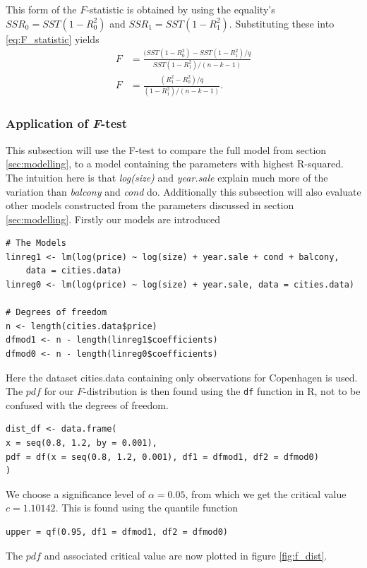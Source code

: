 This form of the $F$-statistic is obtained by using the equality's $SSR_0 = SST(1 - R^2_0)$ and $SSR_1 = SST(1-R^2_1)$. Substituting these into \eqref{eq:F_statistic} yields
\begin{align}\label{eq:F_test_R}
    F &= \frac{(SST(1 - R^2_0) - SST(1-R^2_1)/q}{SST(1-R^2_1)/(n-k-1)} \nonumber \\
    F &= \frac{(R^2_1 - R^2_0)/q}{(1 - R^2_1)/(n-k-1)}.
\end{align}


\subsubsection{Application of \textit{F}-test}\label{sec:app_F_test}
This subsection will use the F-test to compare the full model from section \ref{sec:modelling}, to a model containing the parameters with highest R-squared. 
The intuition here is that \textit{log(size)} and \textit{year.sale} explain much more of the variation than \textit{balcony} and \textit{cond} do.
Additionally this subsection will also evaluate other models constructed from the parameters discussed in section \ref{sec:modelling}.
Firstly our models are introduced
\begin{lstlisting}
# The Models
linreg1 <- lm(log(price) ~ log(size) + year.sale + cond + balcony, 
    data = cities.data)
linreg0 <- lm(log(price) ~ log(size) + year.sale, data = cities.data)
    
# Degrees of freedom
n <- length(cities.data$price)
dfmod1 <- n - length(linreg1$coefficients)
dfmod0 <- n - length(linreg0$coefficients)
\end{lstlisting}
Here the dataset cities.data containing only observations for Copenhagen is used.
The $pdf$ for our $F$-distribution is then found using the \texttt{df} function in R, not to be confused with the degrees of freedom. 
\begin{lstlisting}
dist_df <- data.frame(
x = seq(0.8, 1.2, by = 0.001),
pdf = df(x = seq(0.8, 1.2, 0.001), df1 = dfmod1, df2 = dfmod0)
)
\end{lstlisting}
We choose a significance level of $\alpha = 0.05$, from which we get the critical value $c=1.10142$. 
This is found using the quantile function
\begin{lstlisting}
upper = qf(0.95, df1 = dfmod1, df2 = dfmod0)
\end{lstlisting}
The $pdf$ and associated critical value are now plotted in figure \ref{fig:f_dist}.
    
